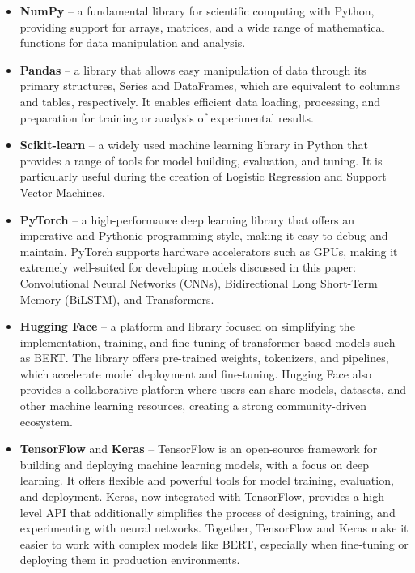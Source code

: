 \begin{itemize}
    \item \textbf{NumPy} -- a fundamental library for scientific computing with Python, providing support for arrays, matrices, and a wide range of mathematical functions for data manipulation and analysis.

    \item \textbf{Pandas} -- a library that allows easy manipulation of data through its primary structures, Series and DataFrames, which are equivalent to columns and tables, respectively. It enables efficient data loading, processing, and preparation for training or analysis of experimental results.

    \item \textbf{Scikit-learn} -- a widely used machine learning library in Python that provides a range of tools for model building, evaluation, and tuning. It is particularly useful during the creation of Logistic Regression and Support Vector Machines.

    \item \textbf{PyTorch} -- a high-performance deep learning library that offers an imperative and Pythonic programming style, making it easy to debug and maintain. PyTorch supports hardware accelerators such as GPUs, making it extremely well-suited for developing models discussed in this paper: Convolutional Neural Networks (CNNs), Bidirectional Long Short-Term Memory (BiLSTM), and Transformers.

    \item \textbf{Hugging Face} -- a platform and library focused on simplifying the implementation, training, and fine-tuning of transformer-based models such as BERT. The library offers pre-trained weights, tokenizers, and pipelines, which accelerate model deployment and fine-tuning. Hugging Face also provides a collaborative platform where users can share models, datasets, and other machine learning resources, creating a strong community-driven ecosystem.

    \item \textbf{TensorFlow} and \textbf{Keras} -- TensorFlow is an open-source framework for building and deploying machine learning models, with a focus on deep learning. It offers flexible and powerful tools for model training, evaluation, and deployment. Keras, now integrated with TensorFlow, provides a high-level API that additionally simplifies the process of designing, training, and experimenting with neural networks. Together, TensorFlow and Keras make it easier to work with complex models like BERT, especially when fine-tuning or deploying them in production environments.


\end{itemize}
